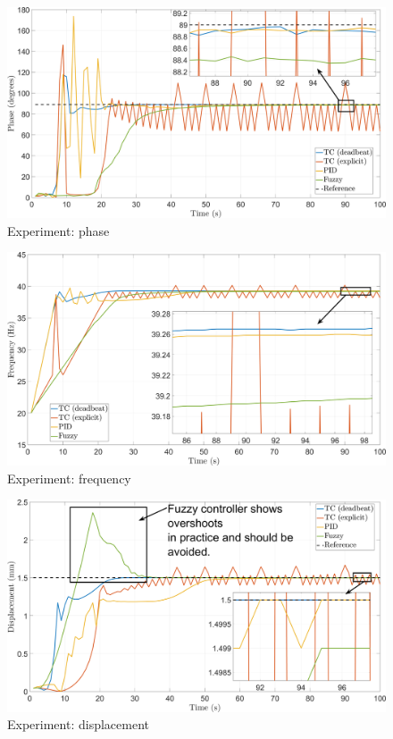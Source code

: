\documentclass[lettersize,journal]{IEEEtran}
\begin{document}
\begin{figure}
    \centering    \includegraphics[width=\linewidth]{F_phase.png}
    \caption{Experiment: phase}
    \label{F_phase}
\end{figure}

\begin{figure}
    \centering    \includegraphics[width=\linewidth]{F_frequency.png}
    \caption{Experiment: frequency}
    \label{F_frequency}
\end{figure}


\begin{figure}
    \centering    \includegraphics[width=\linewidth]{F_displacement.png}
    \caption{Experiment: displacement}
    \label{F_amplitude}
\end{figure}
\end{document}
